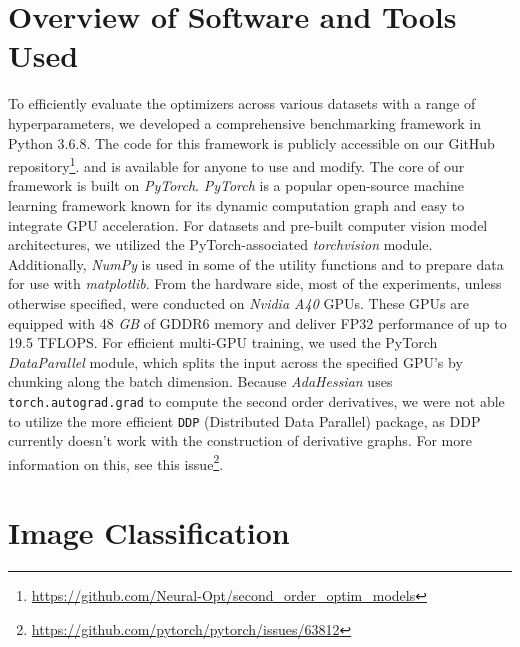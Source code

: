 \section{Overview of Software and Tools Used}
To efficiently evaluate the optimizers across various datasets with a range of hyperparameters,
we developed a comprehensive benchmarking framework in Python 3.6.8.
The code for this framework is publicly accessible on our GitHub repository\footnote{\url{https://github.com/Neural-Opt/second_order_optim_models}}.
and is available for anyone to use and modify. The core of our framework is built on
\emph{PyTorch}\cite{Paszke2019}. \emph{PyTorch} is a popular open-source machine learning framework known for its dynamic computation graph and easy to integrate GPU acceleration.
For datasets and pre-built computer vision model architectures, we utilized the PyTorch-associated \emph{torchvision} module.
Additionally, \emph{NumPy} is used in some of the utility functions and to prepare data for use with \emph{matplotlib}.
From the hardware side, most of the experiments, unless otherwise specified, were conducted on \emph{Nvidia A40} GPUs.
These GPUs are equipped with 48 \emph{GB} of GDDR6 memory and deliver FP32 performance of up to 19.5 TFLOPS.
For efficient multi-GPU training, we used the PyTorch \emph{DataParallel} module, which splits the input across the specified GPU's by chunking along the batch dimension\cite{pytorch_dataparallel}.
Because \emph{AdaHessian} uses \texttt{torch.autograd.grad} to compute the second order derivatives, we were not
able to utilize the more efficient \texttt{DDP} (Distributed Data Parallel) package, as DDP currently
doesn't work with the construction of derivative graphs. For more information on this, see this
issue\footnote{\url{https://github.com/pytorch/pytorch/issues/63812}}.

\section{Image Classification}

